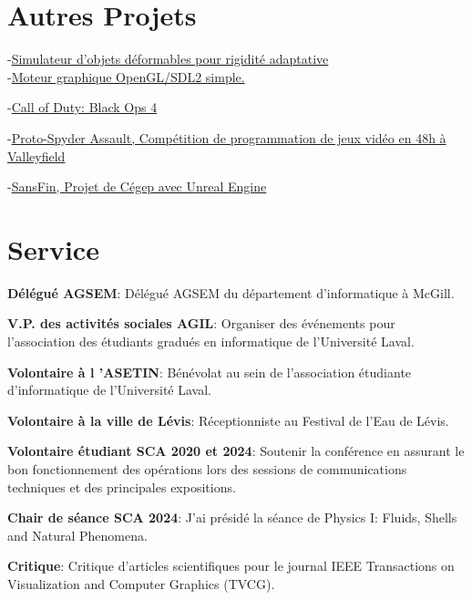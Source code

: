 \documentclass[10pt]{article} %
\begin{document}

\section{Autres Projets}

{
-\href{https://github.com/AlexandreMercierAubin/AdaptiveRigidification2022}{Simulateur d'objets déformables pour rigidité adaptative}\\
-\href{https://github.com/AlexandreMercierAubin/ComputerGraphics}{Moteur graphique OpenGL/SDL2 simple.}\\

}

{
-\href{https://www.callofduty.com/ca/en/blackops4}{Call of Duty: Black Ops 4}

-\href{https://youtu.be/qJjy8b0kuSY}{Proto-Spyder Assault, Compétition de programmation de jeux vidéo en 48h à Valleyfield}

-\href{https://youtu.be/s6vr07Nt1IY}{SansFin, Projet de Cégep avec Unreal Engine}
}

\section{Service}
\textbf{Délégué AGSEM}: Délégué AGSEM du département d'informatique à McGill.

\noindent\textbf{V.P. des activités sociales AGIL}: Organiser des événements pour l'association des étudiants gradués en informatique de l'Université Laval.

\noindent\textbf{Volontaire à l 'ASETIN}: Bénévolat au sein de l'association étudiante d'informatique de l'Université Laval.

\noindent\textbf{Volontaire à la ville de Lévis}: Réceptionniste au Festival de l'Eau de Lévis.

\noindent\textbf{Volontaire étudiant SCA 2020 et 2024}: Soutenir la conférence en assurant le bon fonctionnement des opérations lors des
sessions de communications techniques et des principales expositions.

\noindent\textbf{Chair de séance SCA 2024}:   J'ai présidé la séance de Physics I: Fluids, Shells and Natural Phenomena.

\noindent\textbf{Critique}: Critique d'articles scientifiques pour le journal IEEE Transactions on Visualization and Computer Graphics (TVCG).
\end{document}
